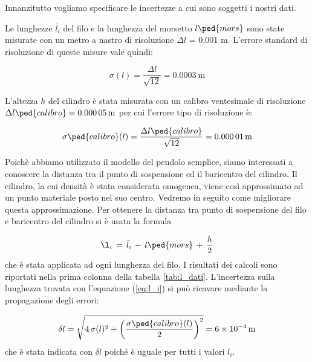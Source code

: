 \label{l_medie}

Innanzitutto vogliamo specificare le incertezze a cui sono soggetti i nostri dati.

Le lunghezze $\bar{l}_i$ del filo e la lunghezza del morsetto $l\ped{mors}$ sono state misurate con un metro a nastro di risoluzione
$\Delta l$ = 0.001 m. L'errore standard di risoluzione di queste misure vale quindi:

\begin{equation}
    \sigma(l) = \frac{\Delta l}{\sqrt{12}} = \SI{0.0003}{\metre}
\end{equation}

L'altezza $h$ del cilindro è stata misurata con un calibro ventesimale di risoluzione $\Delta l\ped{calibro} = \SI{0.00005}{\meter}$
per cui l'errore tipo di risoluzione è:

\begin{equation}
    \sigma\ped{calibro}(l) = \frac{\Delta l\ped{calibro}}{\sqrt{12}} = \SI{0.00001}{\metre}
\end{equation}

Poichè abbiamo utilizzato il modello del pendolo semplice, siamo interessati a conoscere la distanza tra il punto
di sospensione ed il baricentro del cilindro. Il cilindro, la cui densità è stata considerata omogenea,
viene così approssimato ad un punto materiale posto nel suo centro. Vedremo in seguito come migliorare questa approssimazione.
Per ottenere la distanza tra punto di sospensione del filo e baricentro del cilindro si è usata la formula

\begin{equation}
	\l_i \,=\, \bar{l}_i \,-\, l\ped{mors} \,+\, \frac{h}{2}
    \label{eq:l_i}
\end{equation}
%
che è stata applicata ad ogni lunghezza del filo. I risultati dei calcoli sono riportati nella prima colonna
della tabella \ref{tab:l_dati}. L'incertezza sulla lunghezza trovata con l'equazione (\ref{eq:l_i}) si può ricavare mediante la propagazione
degli errori:

\begin{equation}
	\delta l = \sqrt{4\,\sigma(l)^2 + \left(\frac{\sigma\ped{calibro}(l)}{2}\right) ^2} = \SI{6e-4}{m}
\end{equation}
%
che è stata indicata con $\delta l$ poiché è uguale per tutti i valori $l_i$.

